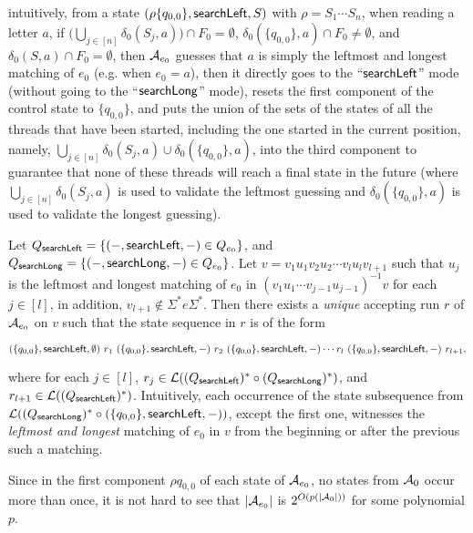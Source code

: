 \begin{itemize}
\begin{itemize}
		\medskip
		intuitively, from a state $(\rho \{q_{0,0}\}, \mathsf{searchLeft}, S)$ with $\rho = S_1 \cdots S_n$, when reading a letter $a$, if $\big(\bigcup \limits_{j \in [n]} \delta_0(S_j, a) \big) \cap F_0 = \emptyset$, $\delta_0(\{q_{0,0}\}, a) \cap F_0 \neq \emptyset$, and $\delta_0(S,a) \cap F_0 = \emptyset$, then $\mathcal{A}_{e_0}$  guesses that $a$ is simply the leftmost and longest matching of $e_0$ (e.g. when $e_0= a$), then it directly goes to the ``$\mathsf{searchLeft}$'' mode (without going to the ``$\mathsf{searchLong}$'' mode), resets the first component of the control state to $\{q_{0,0}\}$, and puts the union of the sets of the states of all the threads that have been started, including the one started in the current position, namely, $\bigcup \limits_{j \in [n]} \delta_0(S_j, a) \cup \delta_0(\{q_{0,0}\}, a)$, into the third component to  guarantee that none of these threads will reach a final state in the future (where $\bigcup \limits_{j \in [n]} \delta_0(S_j, a)$ is used to validate the leftmost guessing and $\delta_0(\{q_{0,0}\}, a)$ is used to validate the longest guessing).
	\end{itemize}
\end{itemize}

Let $Q_{\mathsf{searchLeft}}  = \{ (-, \mathsf{searchLeft}, -) \in Q_{e_0} \}$,  and $Q_{\mathsf{searchLong}} = \{ (-, \mathsf{searchLong}, -)  \in Q_{e_0}\}$.
Let $v = v_1 u_1 v_2 u_2 \cdots v_l u_l v_{l+1}$ such that $u_j$ is the leftmost and longest matching of $e_0$ in $(v_1 u_1 \cdots v_{j-1} u_{j-1})^{-1} v$ for each $j \in [l]$, in addition, $v_{l+1} \not \in \Sigma^\ast e \Sigma^\ast$. Then there exists a \emph{unique} accepting run $r$ of $\mathcal{A}_{e_0}$ on $v$ such that the state sequence in $r$ is of the form

\medskip
{\small
$
(\{q_{0,0}\}, \mathsf{searchLeft}, \emptyset)\ r_1\ ( \{q_{0,0}\}, \mathsf{searchLeft}, -) \ r_2\ ( \{q_{0,0}\}, \mathsf{searchLeft}, -)
\cdots r_l\ ( \{q_{0,0}\}, \mathsf{searchLeft}, -)\ r_{l+1},
$
}
\medskip

where for each $j \in [l]$, $r_j \in \mathcal{L}((Q_{\mathsf{searchLeft}})^* \circ (Q_{\mathsf{searchLong}})^*)$, and $r_{l+1} \in \mathcal{L}((Q_{\mathsf{searchLeft}})^*)$. Intuitively, each occurrence of the state subsequence from $\mathcal{L}((Q_{\mathsf{searchLong}})^* \circ (\{q_{0,0}\}, \mathsf{searchLeft},-))$, except the first one, witnesses the \emph{leftmost and longest} matching of $e_0$ in $v$ from the beginning or after the previous such a matching.

Since in the first component $\rho q_{0,0}$ of each state of $\mathcal{A}_{e_0}$, no states from $\mathcal{A}_0$ occur more than once,  it is not hard to see that $|\mathcal{A}_{e_0}|$ is $2^{O(p(|\mathcal{A}_0|))}$ for some polynomial $p$.

